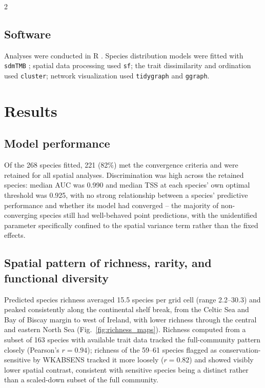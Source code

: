 \begin{spacing}{2}
\subsection{Software}
Analyses were conducted in \textsf{R} \citep{rcoreteamLanguageEnvironment2026}. Species distribution models were fitted with \texttt{sdmTMB} \citep{andersonSdmTMB2024}; spatial data processing used \texttt{sf}; the trait dissimilarity and ordination used \texttt{cluster}; network visualization used \texttt{tidygraph} and \texttt{ggraph}.

\section{Results}

\subsection{Model performance}
Of the 268 species fitted, 221 (82\%) met the convergence criteria and were retained for all spatial analyses. Discrimination was high across the retained species: median AUC was 0.990 and median TSS at each species' own optimal threshold was 0.925, with no strong relationship between a species' predictive performance and whether its model had converged -- the majority of non-converging species still had well-behaved point predictions, with the unidentified parameter specifically confined to the spatial variance term rather than the fixed effects.

\subsection{Spatial pattern of richness, rarity, and functional diversity}
Predicted species richness averaged 15.5 species per grid cell (range 2.2--30.3) and peaked consistently along the continental shelf break, from the Celtic Sea and Bay of Biscay margin to west of Ireland, with lower richness through the central and eastern North Sea (Fig.~\ref{fig:richness_maps}). Richness computed from a subset of 163 species with available trait data tracked the full-community pattern closely (Pearson's $r = 0.94$); richness of the 59--61 species flagged as conservation-sensitive by WKABSENS tracked it more loosely ($r = 0.82$) and showed visibly lower spatial contrast, consistent with sensitive species being a distinct rather than a scaled-down subset of the full community.


\end{spacing}
